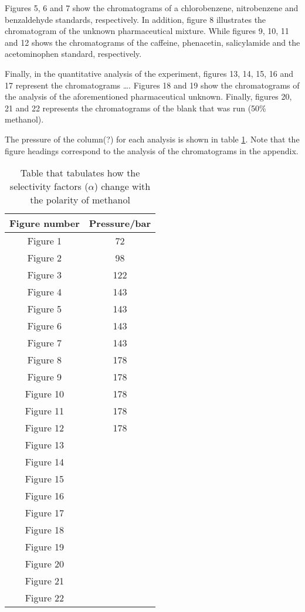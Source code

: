 \documentclass[a4paper, 12pt]{article}
\begin{document}
Figures 5, 6 and 7 show the chromatograms of a chlorobenzene, nitrobenzene and benzaldehyde standards, respectively. In addition, figure 8 illustrates the chromatogram of the unknown pharmaceutical mixture. While figures 9, 10, 11 and 12 shows the chromatograms of the caffeine, phenacetin, salicylamide and the acetominophen standard, respectively.

Finally, in the quantitative analysis of the experiment, figures 13, 14, 15, 16 and 17 represent the chromatograms \dots{}. Figures 18 and 19 show the chromatograms of the analysis of the aforementioned pharmaceutical unknown. Finally, figures 20, 21 and 22 represents the chromatograms of the blank that was run (50\% methanol).

The pressure of the column(?) for each analysis is shown in table \ref{tab-pressure}. Note that the figure headings correspond to the analysis of the chromatograms in the appendix.

\begin{table}[h!]
	\centering
	\begin{tabular}{|c|c|}
		\hline
		Figure number & Pressure/bar\\
		\hline
		Figure 1  & 72 \\ 
		\hline
		Figure 2 & 98 \\
		\hline
		Figure 3 & 122 \\
		\hline
		Figure 4 & 143 \\
		\hline
		Figure 5 & 143 \\
		\hline
		Figure 6 & 143 \\
		\hline
		Figure 7 & 143 \\
		\hline
		Figure 8 & 178 \\
		\hline
		Figure 9 & 178 \\
		\hline
		Figure 10 & 178 \\
		\hline
		Figure 11 & 178 \\
		\hline
		Figure 12 & 178 \\
		\hline
		Figure 13 & \\
		\hline
		Figure 14 & \\
		\hline
		Figure 15 & \\
		\hline
		Figure 16 & \\
		\hline
		Figure 17 & \\
		\hline
		Figure 18 & \\
		\hline
		Figure 19 & \\
		\hline
		Figure 20 & \\
		\hline
		Figure 21 & \\
		\hline
		Figure 22 &  \\ 
		\hline
	\end{tabular}
	\caption{Table that tabulates how the selectivity factors ($\alpha$) change with the polarity of methanol}
	\label{tab-pressure}
\end{table}
\end{document}
